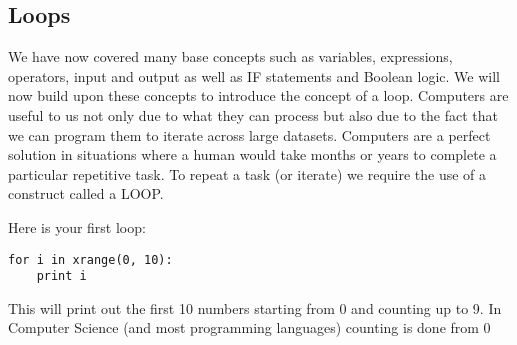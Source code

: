 \documentclass[twocolumn]{article}
\begin{document}
\subsection{Loops}
We have now covered many base concepts such as variables, expressions, operators, input and output as well as IF statements and Boolean logic. We will now build upon these concepts to introduce the concept of a loop. Computers are useful to us not only due to what they can process but also due to the fact that we can program them to iterate across large datasets. Computers are a perfect solution in situations where a human would take months or years to complete a particular repetitive task. To repeat a task (or iterate) we require the use of a construct called a LOOP.

Here is your first loop:
\begin{lstlisting}
for i in xrange(0, 10):
	print i
\end{lstlisting}
This will print out the first 10 numbers starting from 0 and counting up to 9. In Computer Science (and most programming languages) counting is done from 0
\end{document}
